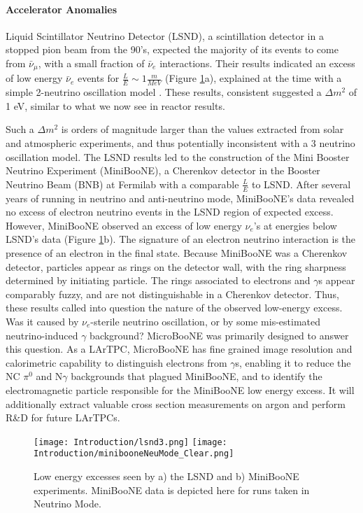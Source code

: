 \paragraph{Accelerator Anomalies} %
Liquid Scintillator Neutrino Detector (LSND), a scintillation detector in a stopped pion beam from the 90's, expected the majority of its events to come from $\bar{\nu}_\mu$, with a small fraction of $\bar{\nu}_e$ interactions. Their results indicated an excess of low energy $\bar{\nu}_e$ events for $\frac{L}{E} \sim 1 \frac{m}{MeV}$ (Figure \ref{fig:lsnd}a), explained at the time with a simple 2-neutrino oscillation model \cite{bib:lsnd}.  These results, consistent suggested a $\Delta m^2$ of 1 eV, similar to what we now see in reactor results.  
\par Such a $\Delta m^2$ is orders of magnitude larger than the values extracted from solar and atmospheric experiments, and thus potentially inconsistent with a 3 neutrino oscillation model. The LSND results led to the construction of the Mini Booster Neutrino Experiment (MiniBooNE), a Cherenkov detector in the Booster Neutrino Beam (BNB) at Fermilab with a comparable $\frac{L}{E}$ to LSND. After several years of running in neutrino and anti-neutrino mode, MiniBooNE's data revealed no excess of electron neutrino events in the LSND region of expected excess. However, MiniBooNE observed an excess of low energy $\nu_e$'s at energies below LSND's data \cite{bib:miniboone} (Figure \ref{fig:lsnd}b).  The signature of an electron neutrino interaction is the presence of an electron in the final state. Because MiniBooNE was a Cherenkov detector, particles appear as rings on the detector wall, with the ring sharpness determined by initiating particle. The rings associated to electrons and $\gamma$s appear comparably fuzzy, and are not distinguishable in a Cherenkov detector. Thus, these results called into question the nature of the observed low-energy excess.  Was it caused by $\nu_e$-sterile neutrino oscillation, or by some mis-estimated neutrino-induced $\gamma$ background?  MicroBooNE was primarily designed to answer this question.  As a LArTPC, MicroBooNE has fine grained image resolution and calorimetric capability to distinguish electrons from $\gamma$s, enabling it to reduce the NC $\pi^0$ and N$\gamma$ backgrounds that plagued MiniBooNE, and to identify the electromagnetic particle responsible for the MiniBooNE low energy excess.  It will additionally extract valuable cross section measurements on argon and perform R\&D for future LArTPCs. 
\begin{figure}[H]
\centering
\texttt{[image: Introduction/lsnd3.png]}
\hspace{1.5 mm}
\texttt{[image: Introduction/minibooneNeuMode\_Clear.png]}
\caption{Low energy excesses seen by a) the LSND and b) MiniBooNE experiments.  MiniBooNE data is depicted here for runs taken in Neutrino Mode.}
\label{fig:lsnd}
\end{figure}

